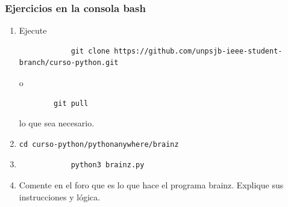 \documentclass[11pt]{beamer}
\begin{document}
\begin{frame}[fragile]
	\frametitle{Ejercicios en la consola bash}
	\begin{enumerate}
		\item Ejecute
		\begin{verbatim}
			git clone https://github.com/unpsjb-ieee-student-branch/curso-python.git
		\end{verbatim}
	    o
        \begin{verbatim}
	    git pull
        \end{verbatim}	    
        lo que sea necesario.
	    \item \begin{verbatim}cd curso-python/pythonanywhere/brainz\end{verbatim}
	    \item \begin{verbatim}
	    	python3 brainz.py
	    \end{verbatim}
        \item Comente en el foro que es lo que hace el programa brainz. Explique sus instrucciones y lógica.
	\end{enumerate}

\end{frame}
\end{document}
